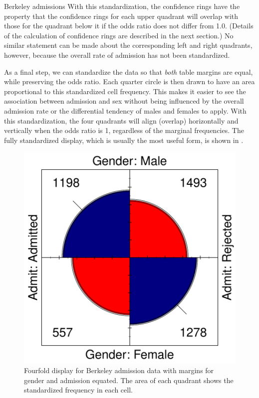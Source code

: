 \documentclass[11pt]{book}
\renewenvironment{knitrout}{\small\renewcommand{\baselinestretch}{.85}}{} %
\begin{document}
\begin{Example}[berkeley2]{Berkeley admissions}
With this standardization, the confidence rings have the property
that the confidence rings for each upper quadrant will overlap
with those for the quadrant below it if the
odds ratio does not differ from 1.0. 
(Details of the calculation of confidence rings are described
in the next section.)
No similar statement can be made about the
corresponding left and right quadrants, however, because
the overall rate of admission has not been standardized.

As a final step, we can standardize the data so that \emph{both} table margins
are equal, while preserving the odds ratio.
Each quarter circle is then drawn to have an area
proportional to this standardized cell frequency.  This makes it
easier to see the association between admission and sex without being
influenced by the overall admission rate or the differential tendency
of males and females to apply.  With this standardization, the four
quadrants will align (overlap) horizontally and vertically
when the odds ratio is 1, regardless of the
marginal frequencies.  The fully standardized display, which is
usually the most useful form, is shown in .

\begin{knitrout}
\color{fgcolor}\begin{kframe}
\begin{alltt}
  
\end{alltt}
\end{kframe}\begin{figure}[!htbp]


\centerline{\includegraphics[width=.6\textwidth]{ch04/fig/berk-fourfold3} }

\caption[Fourfold display for Berkeley admission data with margins for gender and admission equated]{Fourfold display for Berkeley admission data with margins for gender and admission equated. The area of each quadrant shows the standardized frequency in each cell.\label{fig:berk-fourfold3}}
\end{figure}


\end{knitrout}

\end{Example}
\end{document}
